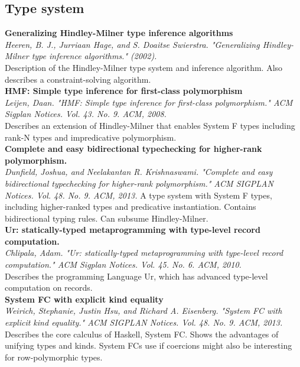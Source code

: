 \documentclass[12pt]{article}
\begin{document}
\subsection{Type system}
\textbf{Generalizing Hindley-Milner type inference algorithms} \\
\textit{Heeren, B. J., Jurriaan Hage, and S. Doaitse Swierstra. "Generalizing Hindley-Milner type inference algorithms." (2002).} \\
Description of the Hindley-Milner type system and inference algorithm. Also describes a constraint-solving algorithm.
\\
\textbf{HMF: Simple type inference for first-class polymorphism} \\
\textit{Leijen, Daan. "HMF: Simple type inference for first-class polymorphism." ACM Sigplan Notices. Vol. 43. No. 9. ACM, 2008.} \\
Describes an extension of Hindley-Milner that enables System F types including rank-N types and impredicative polymorphism.
\\
\textbf{Complete and easy bidirectional typechecking for higher-rank polymorphism.} \\
\textit{Dunfield, Joshua, and Neelakantan R. Krishnaswami. "Complete and easy bidirectional typechecking for higher-rank polymorphism." ACM SIGPLAN Notices. Vol. 48. No. 9. ACM, 2013.} 
A type system with System F types, including higher-ranked types and predicative instantiation. Contains bidirectional typing rules. Can subsume Hindley-Milner.
\\
\textbf{Ur: statically-typed metaprogramming with type-level record computation.} \\
\textit{Chlipala, Adam. "Ur: statically-typed metaprogramming with type-level record computation." ACM Sigplan Notices. Vol. 45. No. 6. ACM, 2010.} \\
Describes the programming Language Ur, which has advanced type-level computation on records.
\\
\textbf{System FC with explicit kind equality} \\
\textit{Weirich, Stephanie, Justin Hsu, and Richard A. Eisenberg. "System FC with explicit kind equality." ACM SIGPLAN Notices. Vol. 48. No. 9. ACM, 2013.} \\
Describes the core calculus of Haskell, System FC. Shows the advantages of unifying types and kinds. System FCs use if coercions might also be interesting for row-polymorphic types.
\end{document}
